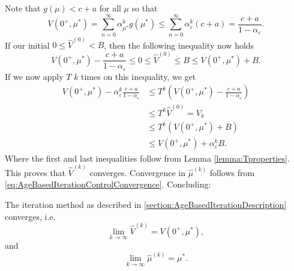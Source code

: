 Note that $g(\mu)<c+a$ for all $\mu$ so that 
$$
V(0^+,\mu^*)=\sum\limits_{n=0}^\infty \alpha_{\mu^*}^kg(\mu^*)\leq \sum\limits_{n=0}^\infty \alpha_\varepsilon^k(c+a)=\frac{c+a}{1-\alpha_\varepsilon}.
$$
If our initial $0\leq \hat{V}^{(0)}<B$, then the following inequality now holds
$$
V(0^+,\mu^*)-\frac{c+a}{1-\alpha_\varepsilon}\leq 0\leq \hat{V}^{(0)}\leq B\leq V(0^+,\mu^*)+B.
$$
If we now apply $T$ $k$ times on this inequality, we get
\[\begin{split}
V(0^+,\mu^*)-\alpha_\varepsilon^k\frac{c+a}{1-\alpha_\varepsilon} &\leq T^k(V(0^+,\mu^*)-\frac{c+a}{1-\alpha_\varepsilon})\\
&\leq  T^k\hat{V}^{(0)}=V_k\\
&\leq T^k(V(0^+,\mu^*)+B) \\
&\leq V(0^+,\mu^*)+\alpha_\varepsilon^kB.
\end{split}\]
Where the first and last inequalities follow from Lemma \ref{lemma:Tproperties}.
This proves that $\hat{V}^{(k)}$ converges.
Convergence in $\hat\mu^{(k)}$ follows from \eqref{eq:AgeBasedIterationControlConvergence}.
Concluding:
\begin{theorem}
	The iteration method as described in \ref*{section:AgeBasedIterationDescription} converges, i.e.
	\[\lim\limits_{k\rightarrow\infty}\hat{V}^{(k)}=V(0^+,\mu^*),\]
	and
	\[\lim\limits_{k\rightarrow\infty}\hat{\mu}^{(k)}=\mu^*.\]
\end{theorem}